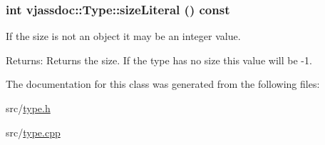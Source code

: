 \hypertarget{classvjassdoc_1_1Type_52c75b9b928f2027d83837fc7cb279a5}{
\subsubsection{\setlength{\rightskip}{0pt plus 5cm}int vjassdoc::Type::sizeLiteral () const}}
\label{classvjassdoc_1_1Type_52c75b9b928f2027d83837fc7cb279a5}


If the size is not an object it may be an integer value. \begin{Desc}
\item[Returns:]Returns the size. If the type has no size this value will be -1. \end{Desc}


The documentation for this class was generated from the following files:\begin{CompactItemize}
\item 
src/\hyperlink{type_8h}{type.h}\item 
src/\hyperlink{type_8cpp}{type.cpp}\end{CompactItemize}
